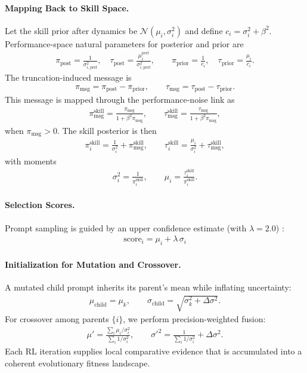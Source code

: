\documentclass{article}
\theoremstyle{plain}
\theoremstyle{definition}
\theoremstyle{remark}
\begin{document}
\paragraph{Mapping Back to Skill Space.}
Let the skill prior after dynamics be $\mathcal{N}(\mu_i,\sigma_i^2)$ and define $c_i=\sigma_i^2+\beta^2$. Performance-space natural parameters for posterior and prior are
\begin{align*}
\pi_{\text{post}}=\frac{1}{\sigma_{i,\text{perf}}^2}, \quad
\tau_{\text{post}}=\frac{\mu_i^{\text{perf}}}{\sigma_{i,\text{perf}}^2}, \qquad
\pi_{\text{prior}}=\frac{1}{c_i}, \quad
\tau_{\text{prior}}=\frac{\mu_i}{c_i}.
\end{align*}
The truncation-induced message is
\begin{align*}
\pi_{\text{msg}}=\pi_{\text{post}}-\pi_{\text{prior}}, \qquad
\tau_{\text{msg}}=\tau_{\text{post}}-\tau_{\text{prior}} .
\end{align*}
This message is mapped through the performance-noise link as
\begin{align*}
\pi_{\text{msg}}^{\text{skill}}=\frac{\pi_{\text{msg}}}{1+\beta^2\pi_{\text{msg}}}, \qquad
\tau_{\text{msg}}^{\text{skill}}=\frac{\tau_{\text{msg}}}{1+\beta^2\pi_{\text{msg}}},
\end{align*}
when $\pi_{\text{msg}}>0$. The skill posterior is then
\begin{align*}
\pi_i^{\text{skill}}=\frac{1}{\sigma_i^2}+\pi_{\text{msg}}^{\text{skill}}, \qquad
\tau_i^{\text{skill}}=\frac{\mu_i}{\sigma_i^2}+\tau_{\text{msg}}^{\text{skill}},
\end{align*}
with moments
\begin{align*}
\sigma_i^{2}=\frac{1}{\pi_i^{\text{skill}}}, \qquad
\mu_i=\frac{\tau_i^{\text{skill}}}{\pi_i^{\text{skill}}}.
\end{align*}

\paragraph{Selection Scores.}
Prompt sampling is guided by an upper confidence estimate (with $\lambda=2.0$) \citep{srinivas2009gaussian, kaufmann2012bayesian, lucb, zhu2024ucb}:
\begin{align*}
\text{score}_i=\mu_i+\lambda \, \sigma_i
\end{align*}
\paragraph{Initialization for Mutation and Crossover.}
A mutated child prompt inherits its parent’s mean while inflating uncertainty:
\begin{align*}
\mu_{\text{child}}=\mu_k, \qquad
\sigma_{\text{child}}=\sqrt{\sigma_k^2+\Delta\sigma^2}.
\end{align*}
For crossover among parents $\{i\}$, we perform precision-weighted fusion:
\begin{align*}
\mu'=\frac{\sum_i \mu_i/\sigma_i^2}{\sum_i 1/\sigma_i^2}, \qquad
\sigma'^2=\frac{1}{\sum_i 1/\sigma_i^2}+\Delta\sigma^2 .
\end{align*}
Each RL iteration supplies local comparative evidence that is accumulated into a coherent evolutionary fitness landscape.
\end{document}
